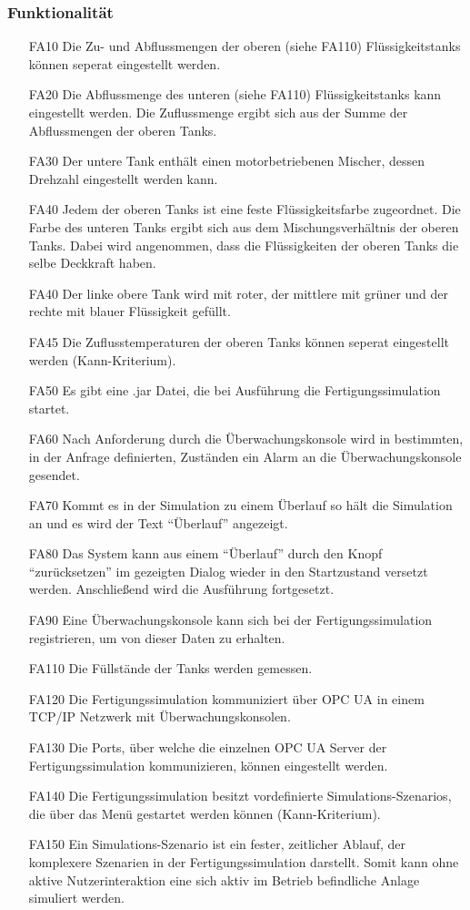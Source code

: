 \documentclass[parskip=full]{scrartcl}
\begin{document}
\subsubsection{Funktionalität}
\begin{enumerate}
\item[FA10] Die Zu- und Abflussmengen der oberen (siehe FA110) Flüssigkeitstanks können seperat eingestellt werden.
\item[FA20] Die Abflussmenge des unteren (siehe FA110) Flüssigkeitstanks kann eingestellt werden. Die Zuflussmenge ergibt sich aus der Summe der Abflussmengen der oberen Tanks.
\item[FA30] Der untere Tank enthält einen motorbetriebenen Mischer, dessen Drehzahl eingestellt werden kann.
\item[FA40] Jedem der oberen Tanks ist eine feste Flüssigkeitsfarbe zugeordnet. Die Farbe des unteren Tanks ergibt sich aus dem Mischungsverhältnis der oberen Tanks. Dabei wird
  angenommen, dass die Flüssigkeiten der oberen Tanks die selbe Deckkraft haben.
\item[FA40] Der linke obere Tank wird mit roter, der mittlere mit grüner und der rechte mit blauer Flüssigkeit gefüllt.
\item[FA45] Die Zuflusstemperaturen der oberen Tanks können seperat eingestellt werden (Kann-Kriterium).
\item[FA50] Es gibt eine .jar Datei, die bei Ausführung die Fertigungssimulation startet.
\item[FA60] Nach Anforderung durch die \"Uberwachungskonsole wird in bestimmten, in der Anfrage definierten, Zust\"anden ein Alarm an die \"Uberwachungskonsole gesendet.
\item[FA70] Kommt es in der Simulation zu einem \"Uberlauf so h\"alt die Simulation an und es wird der Text "`\"Uberlauf"' angezeigt.
\item[FA80] Das System kann aus einem "`\"Uberlauf"' durch den Knopf "`zur\"ucksetzen"' im gezeigten Dialog wieder in den Startzustand versetzt werden. Anschlie{\ss}end wird die Ausführung fortgesetzt.
\item[FA90] Eine \"Uberwachungskonsole kann sich bei der Fertigungssimulation registrieren, um von dieser Daten zu erhalten.
\item[FA110] Die Füllstände der Tanks werden gemessen.
\item[FA120] Die Fertigungssimulation kommuniziert über OPC UA in einem TCP/IP Netzwerk mit Überwachungskonsolen.
\item[FA130] Die Ports, über welche die einzelnen OPC UA Server der Fertigungssimulation kommunizieren, können eingestellt werden.
\item[FA140] Die Fertigungssimulation besitzt vordefinierte \glspl{Simulations-Szenario}, die über das Menü gestartet werden können (Kann-Kriterium).
\item[FA150] Ein \gls{Simulations-Szenario} ist ein fester, zeitlicher Ablauf, der komplexere Szenarien in der Fertigungssimulation darstellt. Somit kann ohne aktive Nutzerinteraktion eine sich aktiv im Betrieb befindliche Anlage simuliert werden.
\end{enumerate}
\end{document}
